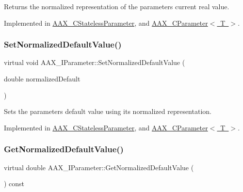Returns the normalized representation of the parameter\textquotesingle{}s current real value. 



Implemented in \mbox{\hyperlink{a01541_a24ae82197c173012d1f2b10c6b3456d0}{A\+A\+X\+\_\+\+C\+Stateless\+Parameter}}, and \mbox{\hyperlink{a01537_a3da77ce2df77961e918418fd2385a50f}{A\+A\+X\+\_\+\+C\+Parameter$<$ T $>$}}.

\mbox{\label{a01857_a42ce03269f84f46d5af70ac198727052}} 
\subsubsection{\texorpdfstring{SetNormalizedDefaultValue()}{SetNormalizedDefaultValue()}}
{\footnotesize\ttfamily virtual void A\+A\+X\+\_\+\+I\+Parameter\+::\+Set\+Normalized\+Default\+Value (\begin{DoxyParamCaption}\item[{double}]{normalized\+Default }\end{DoxyParamCaption})\hspace{0.3cm}{\ttfamily [pure virtual]}}



Sets the parameter\textquotesingle{}s default value using its normalized representation. 



Implemented in \mbox{\hyperlink{a01541_a94043d4e33cf8560e3bd22e6503980d3}{A\+A\+X\+\_\+\+C\+Stateless\+Parameter}}, and \mbox{\hyperlink{a01537_aa07573923547b6d2427ad394aac1ca8c}{A\+A\+X\+\_\+\+C\+Parameter$<$ T $>$}}.

\mbox{\label{a01857_a6e645417c9296b3dd12a95cfb45babb9}} 
\subsubsection{\texorpdfstring{GetNormalizedDefaultValue()}{GetNormalizedDefaultValue()}}
{\footnotesize\ttfamily virtual double A\+A\+X\+\_\+\+I\+Parameter\+::\+Get\+Normalized\+Default\+Value (\begin{DoxyParamCaption}{ }\end{DoxyParamCaption}) const\hspace{0.3cm}{\ttfamily [pure virtual]}}



